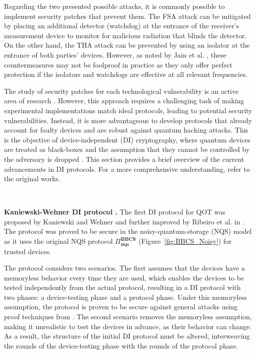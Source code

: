 Regarding the two presented possible attacks, it is commonly possible to implement security patches that prevent them. The FSA attack can be mitigated by placing an additional detector (watchdog) at the entrance of the receiver's measurement device to monitor for malicious radiation that blinds the detector. On the other hand, the THA attack can be prevented by using an isolator at the entrance of both parties' devices. However, as noted by Jain et al. \cite{JSKEML16}, these countermeasures may not be foolproof in practice as they only offer perfect protection if the isolators and watchdogs are effective at all relevant frequencies.

The study of security patches for each technological vulnerability is an active area of research \cite{JBI+16}. However, this approach requires a challenging task of making experimental implementations match ideal protocols, leading to potential security vulnerabilities. Instead, it is more advantageous to develop protocols that already account for faulty devices and are robust against quantum hacking attacks. This is the objective of device-independent (DI) cryptography, where quantum devices are treated as black-boxes and the assumption that they cannot be controlled by the adversary is dropped \cite{MY04, E91}. This section provides a brief overview of the current advancements in DI protocols. For a more comprehensive understanding, refer to the original works.

\

\noindent\textbf{Kaniewski-Wehner DI protocol \cite{KW16}.} The first DI protocol for QOT was proposed by Kaniewski and Wehner \cite{KW16} and further improved by Ribeiro et al. in \cite{RTK+18}.  The protocol was proved to be secure in the noisy-quantum-storage (NQS) model as it uses the original NQS protocol $\Pi^{\textbf{BBCS}}_{\textbf{nqs}}$ (Figure~\ref{fig:BBCS_Noisy}) for trusted devices.

The protocol considers two scenarios. The first assumes that the devices have a memoryless behavior every time they are used, which enables the devices to be tested independently from the actual protocol, resulting in a DI protocol with two phases: a device-testing phase and a protocol phase. Under this memoryless assumption, the protocol is proven to be secure against general attacks using proof techniques from \cite{KWW12}. The second scenario removes the memoryless assumption, making it unrealistic to test the devices in advance, as their behavior can change. As a result, the structure of the initial DI protocol must be altered, interweaving the rounds of the device-testing phase with the rounds of the protocol phase.


